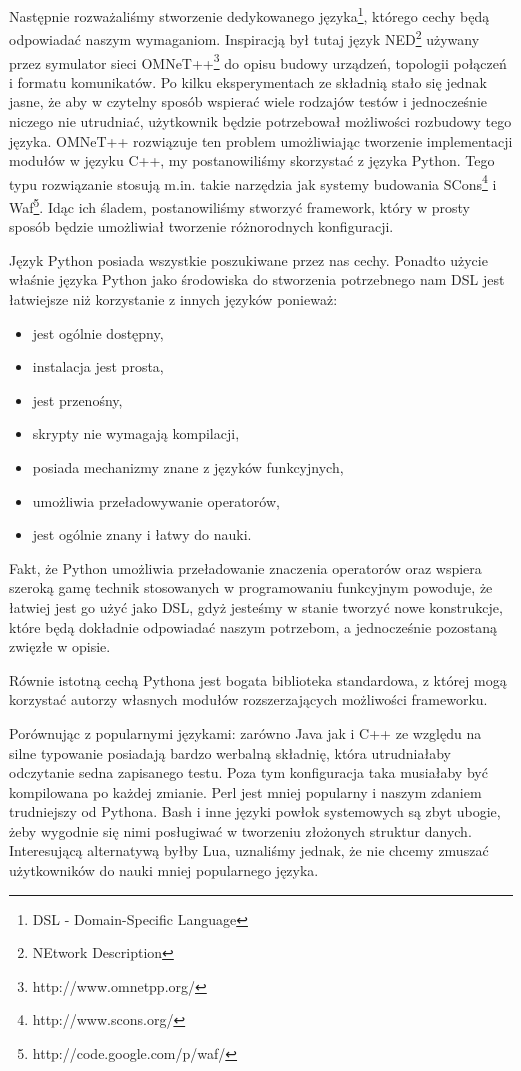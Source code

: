 \documentclass[00-praca-magisterska.tex]{subfiles}
\begin{document}
Następnie rozważaliśmy stworzenie dedykowanego języka\footnote{DSL -
Domain-Specific Language}, którego cechy będą odpowiadać naszym wymaganiom.
Inspiracją był tutaj język NED\footnote{NEtwork Description} używany przez
symulator sieci OMNeT++\footnote{http://www.omnetpp.org/} do opisu budowy
urządzeń, topologii połączeń i formatu komunikatów. Po kilku eksperymentach ze
składnią stało się jednak jasne, że aby w czytelny sposób wspierać wiele
rodzajów testów i jednocześnie niczego nie utrudniać, użytkownik będzie
potrzebował możliwości rozbudowy tego języka. OMNeT++ rozwiązuje ten problem
umożliwiając tworzenie implementacji modułów w języku C++, my postanowiliśmy
skorzystać z języka Python. Tego typu rozwiązanie stosują m.in. takie narzędzia
jak systemy budowania SCons\footnote{http://www.scons.org/} i
Waf\footnote{http://code.google.com/p/waf/}.  Idąc ich śladem, postanowiliśmy
stworzyć framework, który w prosty sposób będzie umożliwiał tworzenie
różnorodnych konfiguracji.

Język Python posiada wszystkie poszukiwane przez nas cechy. Ponadto użycie właśnie
języka Python jako środowiska do stworzenia potrzebnego nam DSL jest łatwiejsze niż
korzystanie z innych języków ponieważ:
\begin{itemize}
\item jest ogólnie dostępny,
\item instalacja jest prosta,
\item jest przenośny,
\item skrypty nie wymagają kompilacji,
\item posiada mechanizmy znane z języków funkcyjnych,
\item umożliwia przeładowywanie operatorów,
\item jest ogólnie znany i łatwy do nauki.
\end{itemize}

Fakt, że Python umożliwia przeładowanie znaczenia operatorów oraz wspiera
szeroką gamę technik stosowanych w programowaniu funkcyjnym powoduje, że
łatwiej jest go użyć jako DSL, gdyż jesteśmy w stanie tworzyć nowe konstrukcje,
które będą dokładnie odpowiadać naszym potrzebom, a jednocześnie pozostaną
zwięzłe w opisie.

Równie istotną cechą Pythona jest bogata biblioteka standardowa, z której mogą
korzystać autorzy własnych modułów rozszerzających możliwości frameworku.

Porównując z popularnymi językami: zarówno Java jak i C++ ze względu na
silne typowanie posiadają bardzo werbalną składnię, która utrudniałaby
odczytanie sedna zapisanego testu. Poza tym konfiguracja taka musiałaby być
kompilowana po każdej zmianie. Perl jest mniej popularny i naszym zdaniem
trudniejszy od Pythona. Bash i inne języki powłok systemowych są zbyt ubogie,
żeby wygodnie się nimi posługiwać w tworzeniu złożonych struktur danych.
Interesującą alternatywą byłby Lua, uznaliśmy jednak, że nie chcemy zmuszać
użytkowników do nauki mniej popularnego języka.
\end{document}
